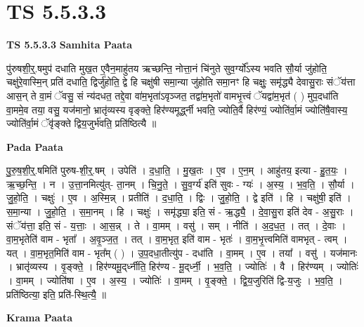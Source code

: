 \documentclass[17pt]{extarticle}
\begin{document}
\section{ TS 5.5.3.3 }

\textbf{TS 5.5.3.3 } \newline
\textbf{Samhita Paata} \newline

पु॑रुषशी॒र्॒.षमुप॑ दधाति मुख॒त ए॒वैन॒माहु॑तय ऋच्छन्ति॒ नोत्ता॒नं चि॑नुते सुव॒र्ग्यो᳚ऽस्य भवति सौ॒र्या जु॑होति॒ चक्षु॑रे॒वास्मि॒न् प्रति॑ दधाति॒ द्विर्जु॑होति॒ द्वे हि चक्षु॑षी समा॒न्या जु॑होति समा॒नꣳ हि चक्षुः॒ समृ॑द्ध्यै देवासु॒राः संॅय॑त्ता आस॒न् ते वा॒मं ॅवसु॒ सं न्य॑दधत॒ तद्दे॒वा वा॑म॒भृता॑ऽवृञ्जत॒ तद्वा॑म॒भृतो॑ वामभृ॒त्त्वं ॅयद्वा॑म॒भृत॑ ( ) मुप॒दधा॑ति वा॒ममे॒व तया॒ वसु॒ यज॑मानो॒ भ्रातृ॑व्यस्य वृङ्क्ते॒ हिर॑ण्यमूर्द्ध्नी भवति॒ ज्योति॒र्वै हिर॑ण्यं॒ ज्योति॑र्वा॒मं ज्योति॑षै॒वास्य॒ ज्योति॑र्वा॒मं ॅवृ॑ङ्क्ते द्विय॒जुर्भ॑वति॒ प्रति॑ष्ठित्यै ॥ \newline

\textbf{Pada Paata} \newline

पु॒रु॒ष॒शी॒र्॒.षमिति॑ पुरुष-शी॒र्॒.षम् । उपेति॑ । द॒धा॒ति॒ । मु॒ख॒तः । ए॒व । ए॒न॒म् । आहु॑तय॒ इत्या - हु॒त॒यः॒ । ऋ॒च्छ॒न्ति॒ । न । उ॒त्ता॒नमित्यु॑त्- ता॒नम् । चि॒नु॒ते॒ । सु॒व॒र्ग्य॑ इति॑ सुवः - ग्यः॑ । अ॒स्य॒ । भ॒व॒ति॒ । सौ॒र्या । जु॒हो॒ति॒ । चक्षुः॑ । ए॒व । अ॒स्मि॒न्न् । प्रतीति॑ । द॒धा॒ति॒ । द्विः । जु॒हो॒ति॒ । द्वे इति॑ । हि । चक्षु॑षी॒ इति॑ । स॒मा॒न्या । जु॒हो॒ति॒ । स॒मा॒नम् । हि । चक्षुः॑ । समृ॑द्ध्या॒ इति॒ सं - ऋ॒द्ध्यै॒ । दे॒वा॒सु॒रा इति॑ देव - अ॒सु॒राः । संॅय॑त्ता॒ इति॒ सं - य॒त्ताः॒ । आ॒स॒न्न् । ते । वा॒मम् । वसु॑ । सम् । नीति॑ । अ॒द॒ध॒त॒ । तत् । दे॒वाः । वा॒म॒भृतेति॑ वाम - भृता᳚ । अ॒वृ॒ञ्ज॒त॒ । तत् । वा॒म॒भृत॒ इति॑ वाम - भृतः॑ । वा॒म॒भृ॒त्त्वमिति॑ वामभृत् - त्वम् । यत् । वा॒म॒भृत॒मिति॑ वाम - भृत᳚म् ( ) । उ॒प॒दधा॒तीत्यु॑प - दधा॑ति । वा॒मम् । ए॒व । तया᳚ । वसु॑ । यज॑मानः । भ्रातृ॑व्यस्य । वृ॒ङ्क्ते॒ । हिर॑ण्यमू॒द्‌र्ध्नीति॒ हिर॑ण्य - मू॒द्‌र्ध्नी॒ । भ॒व॒ति॒ । ज्योतिः॑ । वै । हिर॑ण्यम् । ज्योतिः॑ । वा॒मम् । ज्योति॑षा । ए॒व । अ॒स्य॒ । ज्योतिः॑ । वा॒मम् । वृ॒ङ्क्ते॒ । द्वि॒य॒जुरिति॑ द्वि-य॒जुः । भ॒व॒ति॒ । प्रति॑ष्ठित्या॒ इति॒ प्रति॑-स्थि॒त्यै॒ ॥  \newline


\textbf{Krama Paata} \newline
\end{document}
